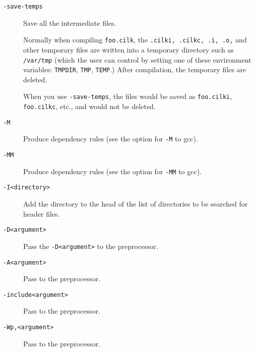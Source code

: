 \begin{description}
\item[\texttt{-save-temps}\\] Save all the intermediate files.

Normally when compiling \texttt{foo.cilk}, the \texttt{.cilki, .cilkc,
.i, .o,} and other temporary files are written into a temporary
directory such as \texttt{/var/tmp} (which the user can control by
setting one of these environment variables: \texttt{TMPDIR},
\texttt{TMP}, \texttt{TEMP}.)  After compilation, the temporary files
are deleted.

When you use \texttt{-save-temps}, the files would be saved as
\texttt{foo.cilki}, \texttt{foo.cilkc}, etc., and would not be
deleted.

\item[\texttt{-M}\\] Produce dependency rules (see the option for \texttt{-M} to gcc).
\item[\texttt{-MM}\\] Produce dependency rules (see the option for \texttt{-MM} to gcc).
\item[\texttt{-I<directory>}\\] Add the directory to the head of the list of directories to be searched for header files.
\item[\texttt{-D<argument>}\\] Pass the \texttt{-D<argument>} to the preprocessor.
\item[\texttt{-A<argument>}\\] Pass to the preprocessor.
\item[\texttt{-include<argument>}\\] Pass to the preprocessor.
\item[\texttt{-Wp,<argument>}\\] Pass to the preprocessor.


\end{description}
